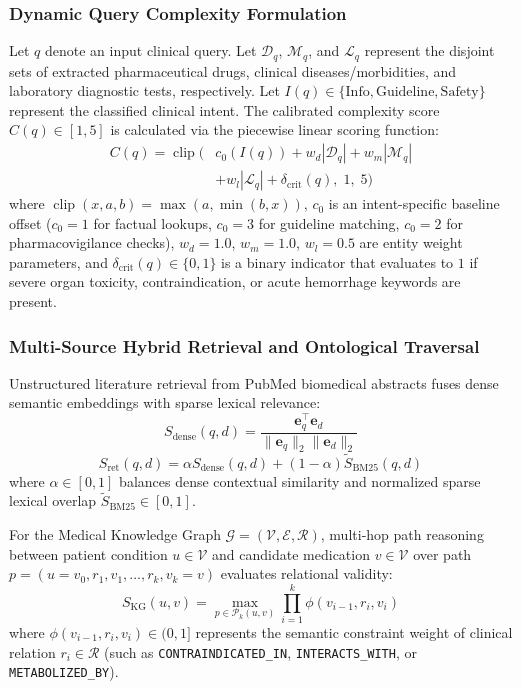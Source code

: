 \documentclass[conference]{IEEEtran}
\begin{document}
\subsubsection{Dynamic Query Complexity Formulation}
Let $q$ denote an input clinical query. Let $\mathcal{D}_q$, $\mathcal{M}_q$, and $\mathcal{L}_q$ represent the disjoint sets of extracted pharmaceutical drugs, clinical diseases/morbidities, and laboratory diagnostic tests, respectively. Let $I(q) \in \{\text{Info}, \text{Guideline}, \text{Safety}\}$ represent the classified clinical intent. The calibrated complexity score $C(q) \in [1, 5]$ is calculated via the piecewise linear scoring function:
\begin{equation}
\begin{aligned}
C(q) = \operatorname{clip}\Big( & c_0(I(q)) + w_d |\mathcal{D}_q| + w_m |\mathcal{M}_q| \\
& + w_l |\mathcal{L}_q| + \delta_{\text{crit}}(q), \; 1, \; 5 \Big)
\end{aligned}
\label{eq:complexity}
\end{equation}
where $\operatorname{clip}(x, a, b) = \max(a, \min(b, x))$, $c_0$ is an intent-specific baseline offset ($c_0 = 1$ for factual lookups, $c_0 = 3$ for guideline matching, $c_0 = 2$ for pharmacovigilance checks), $w_d = 1.0$, $w_m = 1.0$, $w_l = 0.5$ are entity weight parameters, and $\delta_{\text{crit}}(q) \in \{0, 1\}$ is a binary indicator that evaluates to $1$ if severe organ toxicity, contraindication, or acute hemorrhage keywords are present.

\subsubsection{Multi-Source Hybrid Retrieval and Ontological Traversal}
Unstructured literature retrieval from PubMed biomedical abstracts fuses dense semantic embeddings with sparse lexical relevance:
\begin{equation}
S_{\text{dense}}(q, d) = \frac{\mathbf{e}_q^\top \mathbf{e}_d}{\|\mathbf{e}_q\|_2 \|\mathbf{e}_d\|_2}
\end{equation}
\begin{equation}
S_{\text{ret}}(q, d) = \alpha S_{\text{dense}}(q, d) + (1 - \alpha) \tilde{S}_{\text{BM25}}(q, d)
\label{eq:retrieval}
\end{equation}
where $\alpha \in [0, 1]$ balances dense contextual similarity and normalized sparse lexical overlap $\tilde{S}_{\text{BM25}} \in [0, 1]$.

For the Medical Knowledge Graph $\mathcal{G} = (\mathcal{V}, \mathcal{E}, \mathcal{R})$, multi-hop path reasoning between patient condition $u \in \mathcal{V}$ and candidate medication $v \in \mathcal{V}$ over path $p = (u = v_0, r_1, v_1, \dots, r_k, v_k = v)$ evaluates relational validity:
\begin{equation}
S_{\text{KG}}(u, v) = \max_{p \in \mathcal{P}_k(u, v)} \prod_{i=1}^k \phi(v_{i-1}, r_i, v_i)
\label{eq:kg}
\end{equation}
where $\phi(v_{i-1}, r_i, v_i) \in (0, 1]$ represents the semantic constraint weight of clinical relation $r_i \in \mathcal{R}$ (such as \texttt{CONTRAINDICATED\_IN}, \texttt{INTERACTS\_WITH}, or \texttt{METABOLIZED\_BY}).
\end{document}
